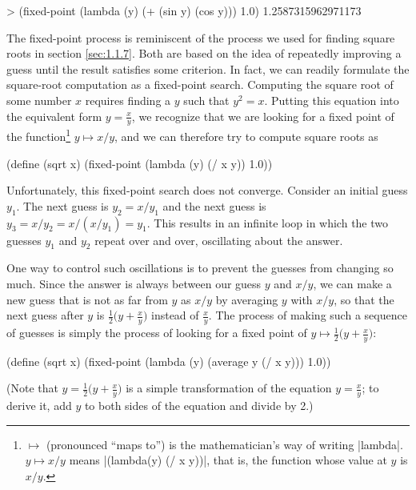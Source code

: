 \begin{schemedisplay}
> (fixed-point (lambda (y) (+ (sin y) (cos y)))
               1.0)
1.2587315962971173
\end{schemedisplay}

The fixed-point process is reminiscent of the process we used for
finding square roots in section \ref{sec:1.1.7}.  Both are based on
the idea of repeatedly improving a guess until the result satisfies
some criterion.  In fact, we can readily formulate the square-root
computation as a fixed-point search.  Computing the square root of
some number $x$ requires finding a $y$ such that $y^2 = x$.  Putting
this equation into the equivalent form $y = \frac{x}{y}$, we recognize
that we are looking for a fixed point of the
function\footnote{$\mapsto$ (pronounced ``maps to'') is the
  mathematician's way of writing \scheme|lambda|.  $y \mapsto x/y$
  means \scheme|(lambda(y) (/ x y))|, that is, the function whose
  value at $y$ is $x/y$.} $y \mapsto x/y$, and we can therefore try to
compute square roots as

\begin{schemedisplay}
(define (sqrt x)
  (fixed-point (lambda (y) (/ x y))
               1.0))
\end{schemedisplay}

Unfortunately, this fixed-point search does not converge.  Consider an
initial guess $y_1$.  The next guess is $y_2 = x/y_1$ and the next
guess is $y_3 = x/y_2 = x/(x/y_1) = y_1$.  This results in an infinite
loop in which the two guesses $y_1$ and $y_2$ repeat over and over,
oscillating about the answer.

One way to control such oscillations is to prevent the guesses from
changing so much.  Since the answer is always between our guess $y$
and $x/y$, we can make a new guess that is not as far from $y$ as
$x/y$ by averaging $y$ with $x/y$, so that the next
guess after $y$ is $\frac{1}{2}\big(y + \frac{x}{y}\big)$
instead of $\frac{x}{y}$.  The process of making such a
sequence of guesses is simply the process of looking for a fixed point
of $y \mapsto \frac{1}{2}\big(y + \frac{x}{y}\big)$:

\begin{schemedisplay}
(define (sqrt x)
  (fixed-point (lambda (y) (average y (/ x y)))
               1.0))
\end{schemedisplay}
(Note that $y = \frac{1}{2}\big(y + \frac{x}{y}\big)$ is a simple
transformation of the equation $y = \frac{x}{y}$; to derive it, add
$y$ to both sides of the equation and divide by 2.)

